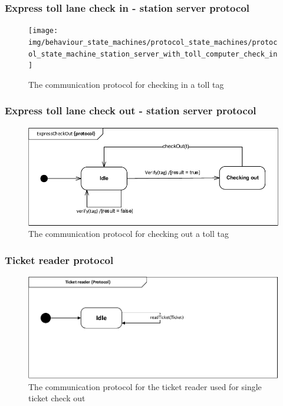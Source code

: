 \subsubsection*{Express toll lane check in - station server protocol}
\begin{figure}[H]
\centering
\texttt{[image: img/behaviour\_state\_machines/protocol\_state\_machines/protocol\_state\_machine\_station\_server\_with\_toll\_computer\_check\_in]}
\caption{The communication protocol for checking in a toll tag}
\label{fig:protocol_state_machine_station_server with_toll_computer_check_in}
\end{figure}

\subsubsection*{Express toll lane check out - station server protocol}
\begin{figure}[H]
\centering
\includegraphics[width=0.7\linewidth]{img/behaviour_state_machines/protocol_state_machines/protocol_state_machine_station_server_to_express_lane_check_out}
\caption{The communication protocol for checking out a toll tag}
\label{fig:protocol_state_machine_station_server with_toll_computer_check_out}
\end{figure}

\subsubsection*{Ticket reader protocol}
\begin{figure}[H]
\centering
\includegraphics[width=0.7\linewidth]{img/behaviour_state_machines/protocol_state_machines/protocol_state_machine_ticket_reader}
\caption{The communication protocol for the ticket reader used for single ticket check out}
\label{fig:protocol_state_machine_ticket_reader}
\end{figure}

